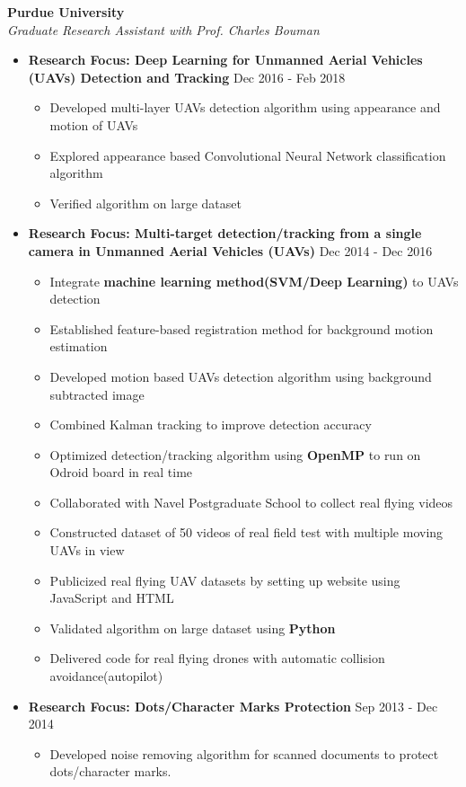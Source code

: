 \documentclass[10pt]{article}
\newenvironment{outerlist}[1][\enskip\textbullet]%
        {\begin{itemize}[#1,leftmargin=*]}{\end{itemize}%
         \vspace{-1.2\baselineskip}}
\newenvironment{innerlist}[1][\enskip\textbullet]%
        {\begin{itemize}[#1,leftmargin=*,parsep=0pt,itemsep=0pt,topsep=0pt,partopsep=0pt]}
        {\end{itemize}}
\begin{document}
\textbf{Purdue University } \\
\emph{Graduate Research Assistant with Prof. Charles Bouman} 
\begin{outerlist}
\vspace{-.1in}
\item[] \textbf{Research Focus: Deep Learning for Unmanned Aerial Vehicles (UAVs) Detection and Tracking} \hfill {Dec 2016 - Feb 2018}
\begin{innerlist}
\vspace{-.05in}        
        \item Developed multi-layer UAVs detection algorithm using appearance and motion of UAVs
        \item Explored appearance based Convolutional Neural Network classification algorithm  
        \item Verified algorithm on large dataset  	
        \end{innerlist}
\item[] \textbf{Research Focus: Multi-target detection/tracking from a single camera in Unmanned Aerial Vehicles (UAVs)} \hfill {Dec 2014 - Dec 2016}
        \begin{innerlist}
\vspace{-.05in}
        \item Integrate \textbf{machine learning method(SVM/Deep Learning)} to UAVs detection
        \item Established feature-based registration method for background motion estimation
        \item Developed motion based UAVs detection algorithm using background subtracted image
        \item Combined Kalman tracking to improve detection accuracy
        \item Optimized detection/tracking algorithm using \textbf{OpenMP} to run on Odroid board in real time
	\item Collaborated with Navel Postgraduate School to collect real flying videos
        \item Constructed dataset of 50 videos of real field test with multiple moving UAVs in view
	\item Publicized real flying UAV datasets by setting up website using JavaScript  and HTML 
        \item Validated algorithm on large dataset using 	\textbf{Python} 
        \item Delivered code for real flying drones with automatic collision avoidance(autopilot)
        \end{innerlist}
\item[] \textbf{Research Focus: Dots/Character Marks Protection} \hfill {Sep 2013 - Dec 2014}
\begin{innerlist}
\vspace{-.05in}
        \item Developed noise removing algorithm for scanned documents to protect dots/character marks.	
        \end{innerlist}
\vspace{.2in}
\end{outerlist}
\end{document}
